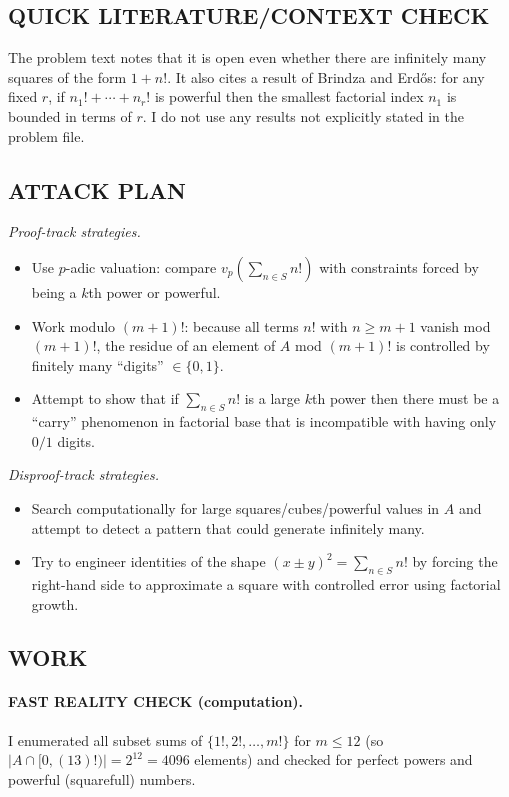 \subsection*{QUICK LITERATURE/CONTEXT CHECK}
The problem text notes that it is open even whether there are infinitely many squares of the form $1+n!$. It also cites a result of Brindza and Erd\H{o}s: for any fixed $r$, if $n_1!+\cdots+n_r!$ is powerful then the smallest factorial index $n_1$ is bounded in terms of $r$.
I do not use any results not explicitly stated in the problem file.

\subsection*{ATTACK PLAN}
\emph{Proof-track strategies.}
\begin{itemize}
\item Use $p$-adic valuation: compare $v_p\left(\sum_{n\in S} n!\right)$ with constraints forced by being a $k$th power or powerful.
\item Work modulo $(m+1)!$: because all terms $n!$ with $n\ge m+1$ vanish mod $(m+1)!$, the residue of an element of $A$ mod $(m+1)!$ is controlled by finitely many ``digits'' $\in\{0,1\}$.
\item Attempt to show that if $\sum_{n\in S} n!$ is a large $k$th power then there must be a ``carry'' phenomenon in factorial base that is incompatible with having only $0/1$ digits.
\end{itemize}

\emph{Disproof-track strategies.}
\begin{itemize}
\item Search computationally for large squares/cubes/powerful values in $A$ and attempt to detect a pattern that could generate infinitely many.
\item Try to engineer identities of the shape $(x\pm y)^2 = \sum_{n\in S} n!$ by forcing the right-hand side to approximate a square with controlled error using factorial growth.
\end{itemize}

\subsection*{WORK}
\paragraph{FAST REALITY CHECK (computation).}
I enumerated all subset sums of $\{1!,2!,\dots,m!\}$ for $m\le 12$ (so $|A\cap[0,(13)! )|=2^{12}=4096$ elements) and checked for perfect powers and powerful (squarefull) numbers.

